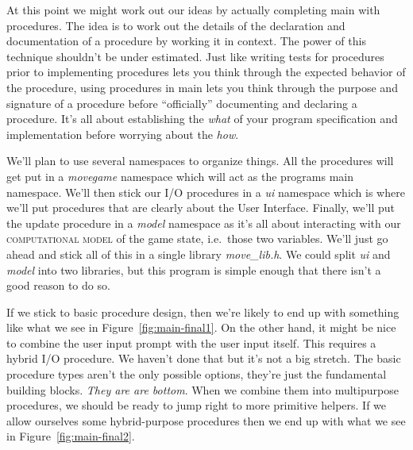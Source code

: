 \documentclass[nobib]{tufte-handout}
\begin{document}
At this point we might work out our ideas by actually completing main with procedures. The idea is to work out the details of the declaration and documentation of a procedure by working it in context. The power of this technique shouldn't be under estimated. Just like writing tests for procedures prior to implementing procedures lets you think through the expected behavior of the procedure, using procedures in main lets you think through the purpose and signature of a procedure before ``officially'' documenting and declaring a procedure. It's all about establishing the \textit{what} of your program specification and implementation before worrying about the \textit{how}.

We'll plan to use several namespaces to organize things. All the procedures will get put in a \textit{movegame} namespace which will act as the programs main namespace.  We'll then stick our I/O procedures in a \textit{ui} namespace which is where we'll put procedures that are clearly about the User Interface. Finally, we'll put the update procedure in a \textit{model} namespace as it's all about interacting with our \textsc{computational model} of the game state, i.e.\ those two variables. We'll just go ahead and stick all of this in a single library \textit{move\_lib.h}. We could split \textit{ui} and \textit{model} into two libraries, but this program is simple enough that there isn't a good reason to do so.

If we stick to basic procedure design, then we're likely to end up with something like what we see in Figure~\ref{fig:main-final1}. On the other hand, it might be nice to combine the user input prompt with the user input itself. This requires a hybrid I/O procedure. We haven't done that but it's not a big stretch. The basic procedure types aren't the only possible options, they're just the fundamental building blocks.  \textit{They are are bottom}. When we combine them into multipurpose procedures, we should be ready to jump right to more primitive helpers. If we allow ourselves some hybrid-purpose procedures then we end up with what we see in Figure~\ref{fig:main-final2}.
\end{document}
